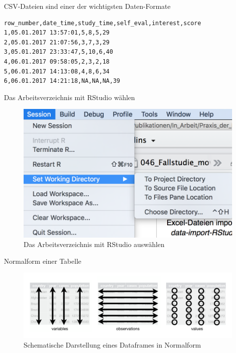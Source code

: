 \begin{frame}[fragile]{CSV-Dateien sind einer der wichtigsten
Daten-Formate}

\begin{verbatim}
row_number,date_time,study_time,self_eval,interest,score
1,05.01.2017 13:57:01,5,8,5,29
2,05.01.2017 21:07:56,3,7,3,29
3,05.01.2017 23:33:47,5,10,6,40
4,06.01.2017 09:58:05,2,3,2,18
5,06.01.2017 14:13:08,4,8,6,34
6,06.01.2017 14:21:18,NA,NA,NA,39
\end{verbatim}

\end{frame}

\begin{frame}{Das Arbeitsverzeichnis mit RStudio wählen}

\begin{figure}

{\centering \includegraphics[width=0.5\linewidth]{../images/tidy/Arbeitsverzeichnis} 

}

\caption{Das Arbeitsverzeichnis mit RStudio auswählen}\label{fig:Arbeitsverzeichnis}
\end{figure}

\end{frame}

\begin{frame}{Normalform einer Tabelle}

\begin{figure}

{\centering \includegraphics[width=0.8\linewidth]{../images/tidy/tidy-1} 

}

\caption{Schematische Darstellung eines Dataframes in Normalform}\label{fig:tidy1}
\end{figure}

\end{frame}

